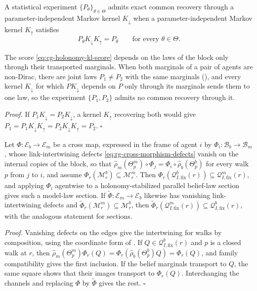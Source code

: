 A statistical experiment $\{P_\theta\}_{\theta\in\Theta}$ admits exact common recovery through a
parameter-independent Markov kernel $K_\downarrow$ when a parameter-independent Markov kernel $K_\uparrow$
satisfies
\begin{equation}
P_\theta K_\downarrow K_\uparrow=P_\theta\qquad\text{for every }\theta\in\Theta.
\label{eq:cg-holonomy-common-recovery}
\end{equation}

The score \eqref{eq:cg-holonomy-kl-score} depends on the laws of the block only through their transported
marginals. When both marginals of a pair of agents are non-Dirac, there are joint laws $P_1\neq P_2$ with
the same marginals (), and every kernel $K_\downarrow$ for
which $PK_\downarrow$ depends on $P$ only through its marginals sends them to one law, so the experiment
$\{P_1,P_2\}$ admits no common recovery through it. 

\noindent\emph{Proof.}
If $P_1K_\downarrow=P_2K_\downarrow$, a kernel $K_\uparrow$ recovering both would give
$P_1=P_1K_\downarrow K_\uparrow=P_2K_\downarrow K_\uparrow=P_2$. $\square$

Let $\Phi:\mathcal E_b\to\mathcal E_m$ be a cross map, expressed in the frame of agent $i$ by
$\Phi_i:\mathcal B_b\to\mathcal B_m$, whose link-intertwining defects \eqref{eq:rg-cross-morphism-defects}
vanish on the internal copies of the block, so that
$\widehat\rho_m(\Theta^m_p)\circ\Phi_j=\Phi_i\circ\widehat\rho_b(\Theta^b_p)$ for every walk $p$ from $j$ to
$i$, and assume $\Phi_r(\mathscr M^b_r)\subseteq\mathscr M^m_r$. Then
$\Phi_r(\mathscr Q^b_{I,\mathrm{fix}}(r))\subseteq\mathscr Q^m_{I,\mathrm{fix}}(r)$, and applying $\Phi_i$
agentwise to a holonomy-stabilized parallel belief-law section gives such a model-law section. If
$\widetilde\Phi:\mathcal E_m\to\mathcal E_b$ likewise has vanishing link-intertwining defects and
$\widetilde\Phi_r(\mathscr M^m_r)\subseteq\mathscr M^b_r$, then
$\widetilde\Phi_r(\mathscr Q^m_{I,\mathrm{fix}}(r))\subseteq\mathscr Q^b_{I,\mathrm{fix}}(r)$, with the
analogous statement for sections. 

\noindent\emph{Proof.}
Vanishing defects on the edges give the intertwining for walks by composition, using the coordinate form of
. If $Q\in\mathscr Q^b_{I,\mathrm{fix}}(r)$ and $p$ is a closed walk at
$r$, then $\widehat\rho_m(\Theta^m_p)\Phi_r(Q)=\Phi_r(\widehat\rho_b(\Theta^b_p)Q)=\Phi_r(Q)$, and family
compatibility gives the first inclusion. If the belief marginals transport to $Q$, the same square shows
that their images transport to $\Phi_r(Q)$. Interchanging the channels and replacing $\Phi$ by
$\widetilde\Phi$ gives the rest. $\square$

